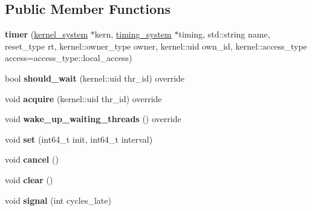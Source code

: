 \subsection*{Public Member Functions}
\begin{DoxyCompactItemize}
\item 
\mbox{\label{classeka2l1_1_1kernel_1_1timer_a623211dbba8a11f437ecbaf0cfc9df4c}} 
{\bfseries timer} (\mbox{\hyperlink{classeka2l1_1_1kernel__system}{kernel\+\_\+system}} $\ast$kern, \mbox{\hyperlink{classeka2l1_1_1timing__system}{timing\+\_\+system}} $\ast$timing, std\+::string name, reset\+\_\+type rt, kernel\+::owner\+\_\+type owner, kernel\+::uid own\+\_\+id, kernel\+::access\+\_\+type access=access\+\_\+type\+::local\+\_\+access)
\item 
\mbox{\label{classeka2l1_1_1kernel_1_1timer_a2c7618aae365ea5ef89d09d9457636f7}} 
bool {\bfseries should\+\_\+wait} (kernel\+::uid thr\+\_\+id) override
\item 
\mbox{\label{classeka2l1_1_1kernel_1_1timer_a52d413a10c16095c976d11a83440cd12}} 
void {\bfseries acquire} (kernel\+::uid thr\+\_\+id) override
\item 
\mbox{\label{classeka2l1_1_1kernel_1_1timer_a5aec6e6c8e5e895f49a1c0cd7dad7991}} 
void {\bfseries wake\+\_\+up\+\_\+waiting\+\_\+threads} () override
\item 
\mbox{\label{classeka2l1_1_1kernel_1_1timer_a699b5310095663cccdbeb84973bf12c9}} 
void {\bfseries set} (int64\+\_\+t init, int64\+\_\+t interval)
\item 
\mbox{\label{classeka2l1_1_1kernel_1_1timer_a72c2673a5621f473787df042b2de217a}} 
void {\bfseries cancel} ()
\item 
\mbox{\label{classeka2l1_1_1kernel_1_1timer_adfbc186d3d2d15c37690f8192a9f9ed0}} 
void {\bfseries clear} ()
\item 
\mbox{\label{classeka2l1_1_1kernel_1_1timer_ace25c232db5b2860b18e3ff36bfa8441}} 
void {\bfseries signal} (int cycles\+\_\+late)
\end{DoxyCompactItemize}
